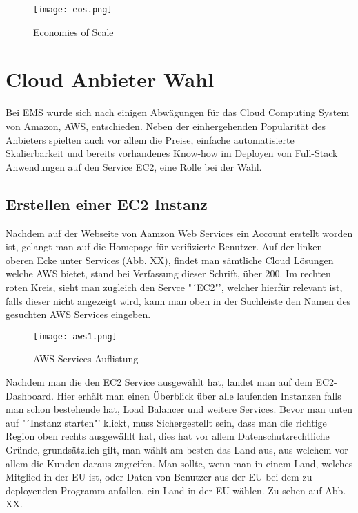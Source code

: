 \begin{center}
\begin{figure}[h]
    \centering
    \texttt{[image: eos.png]}
    \caption{Economies of Scale}
\end{figure}
\end{center}
\break
\section{Cloud Anbieter Wahl}
Bei EMS wurde sich nach einigen Abwägungen für das Cloud Computing System von Amazon, AWS, entschieden. Neben der einhergehenden Popularität des Anbieters spielten auch vor allem die Preise, einfache automatisierte Skalierbarkeit und bereits vorhandenes Know-how im Deployen von Full-Stack Anwendungen auf den Service EC2, eine Rolle bei der Wahl.

\subsection{Erstellen einer EC2 Instanz}
Nachdem auf der Webseite von Aamzon Web Services ein Account erstellt worden ist, gelangt man auf die Homepage für verifizierte Benutzer. Auf der linken oberen Ecke unter Services (Abb. XX), findet man sämtliche Cloud Lösungen welche AWS bietet, stand bei Verfassung dieser Schrift, über 200. Im rechten roten Kreis, sieht man zugleich den Servce "´EC2"', welcher hierfür relevant ist, falls dieser nicht angezeigt wird, kann man oben in der Suchleiste den Namen des gesuchten AWS Services eingeben.

\begin{center}
\begin{figure}[h]
    \centering
    \texttt{[image: aws1.png]}
    \caption{AWS Services Auflistung}
\end{figure}
\end{center}

Nachdem man die den EC2 Service ausgewählt hat, landet man auf dem EC2-Dashboard. Hier erhält man einen Überblick über alle laufenden Instanzen falls man schon bestehende hat, Load Balancer und weitere Services. Bevor man unten auf "´Instanz starten"' klickt, muss Sichergestellt sein, dass man die richtige Region oben rechts ausgewählt hat, dies hat vor allem Datenschutzrechtliche Gründe, grundsätzlich gilt, man wählt am besten das Land aus, aus welchem vor allem die Kunden daraus zugreifen. Man sollte, wenn man in einem Land, welches Mitglied in der EU ist, oder Daten von Benutzer aus der EU bei dem zu deployenden Programm anfallen, ein Land in der EU wählen. Zu sehen auf Abb. XX.

